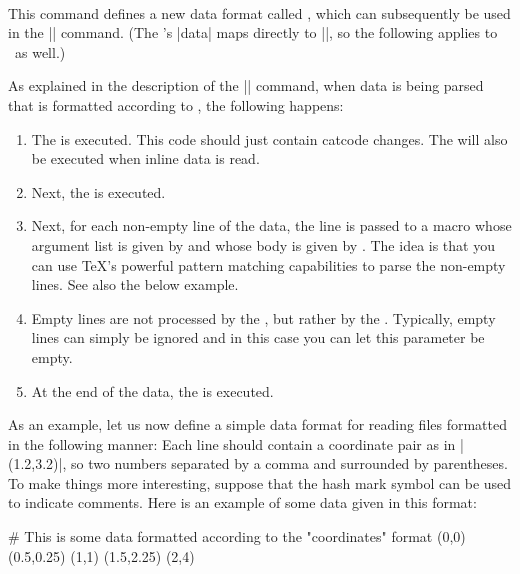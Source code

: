 \begin{command}{\pgfdeclaredataformat{}\\%
}
    This command defines a new data format called , which can
    subsequently be used in the |\pgfdata| command. (The \tikzname's |data|
    maps directly to |\pgfdata|, so the following applies to \tikzname\ as
    well.)

    As explained in the description of the |\pgfdata| command, when data is
    being parsed that is formatted according to , the
    following happens:
    \begin{enumerate}
        \item The  is executed. This code should just
            contain catcode changes. The  will also be
            executed when inline data is read.
        \item Next, the  is executed.
        \item Next, for each non-empty line of the data, the line is passed to
            a macro whose argument list is given by  and
            whose body is given by . The idea is that you can
            use \TeX's powerful pattern matching capabilities to parse the
            non-empty lines. See also the below example.
        \item Empty lines are not processed by the , but rather
            by the . Typically, empty lines can simply be
            ignored and in this case you can let this parameter be empty.
        \item At the end of the data, the  is executed.
    \end{enumerate}

    As an example, let us now define a simple data format for reading files
    formatted in the following manner: Each line should contain a coordinate
    pair as in |(1.2,3.2)|, so two numbers separated by a comma and surrounded
    by parentheses. To make things more interesting, suppose that the hash mark
    symbol can be used to indicate comments. Here is an example of some data
    given in this format:
\begin{codeexample}
# This is some data formatted according to the "coordinates" format
(0,0)
(0.5,0.25)
(1,1)
(1.5,2.25)
(2,4)
\end{codeexample}


\end{command}
